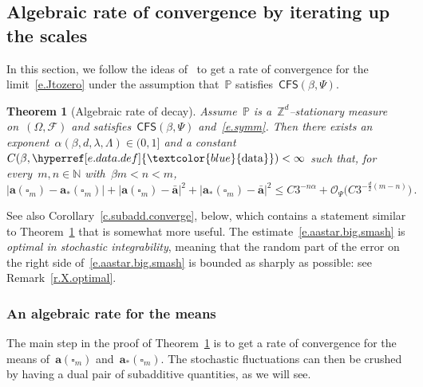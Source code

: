 \documentclass[11pt,twoside]{article} %
\let\oldsquare\square %
\renewcommand{\square}{\oldsquare}
\numberwithin{equation}{section}
\newtheorem{theorem}{Theorem}[section]
\theoremstyle{definition}
\newcommand{\dataref}{\hyperref[e.data.def]{\textcolor{blue}{\ensuremath{\mathrm{data}}}}}
\newcommand*{\N}{\ensuremath{\mathbb{N}}}
\newcommand*{\Zd}{\ensuremath{\mathbb{Z}^d}}
\renewcommand{\a}{\mathbf{a}}
\newcommand{\ahom}{\bar{\a}}
\newcommand{\cu}{\square}
\newcommand{\F}{\mathcal{F}}
\renewcommand{\P}{\mathbb{P}}
\renewcommand{\O}{\mathcal{O}}
\newcommand{\CFS}{\mathsf{CFS}}
\begin{document}
\subsection{Algebraic rate of convergence by iterating up the scales}
\label{ss.subadd.conv}

In this section, we follow the ideas of~\cite{AS,AKMBook} to get a rate of convergence for the limit~\eqref{e.Jtozero} under the assumption that~$\P$ satisfies~$\CFS(\beta,\Psi)$. 

\begin{theorem}[{Algebraic rate of decay}]
\label{t.subadd.converge}
Assume~$\P$ is a~$\Zd$--stationary measure on~$(\Omega,\F)$ and satisfies~$\CFS(\beta,\Psi)$ and~\eqref{e.symm}. 
Then there exists an exponent~$\alpha(\beta,d,\lambda,\Lambda) \in (0,1]$ 
and a constant~$C(\beta,\dataref)<\infty$
such that, for every~$m,n \in\N$ with~$\beta m < n < m$, 
\begin{equation}
\label{e.aastar.big.smash}
|\a(\cu_m) - \a_*(\cu_m)|
+
| \a(\cu_m) - \ahom |^2 
+
|\a_*(\cu_m) - \ahom |^2
\leq 
C3^{-n\alpha}
+ 
\O_\Psi \bigl( C3^{-\frac d2(m-n)} \bigr) 
\,.
\end{equation}
\end{theorem}

See also Corollary~\ref{c.subadd.converge}, below, which contains a statement similar to Theorem~\ref{t.subadd.converge} that is somewhat more useful. 
The estimate~\eqref{e.aastar.big.smash} is \emph{optimal in stochastic integrability}, meaning that the random part of the error on the right side of~\eqref{e.aastar.big.smash} is bounded as sharply as possible: see Remark~\ref{r.X.optimal}. 

\smallskip

\subsubsection{An algebraic rate for the means}

The main step in the proof of Theorem~\ref{t.subadd.converge} is to get a rate of convergence for the means of~$\a(\cu_m)$ and~$\a_*(\cu_m)$. The stochastic fluctuations can then be crushed by having a dual pair of subadditive quantities, as we will see. 

\smallskip
\end{document}
